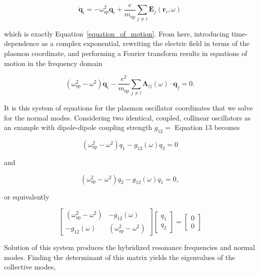 \documentclass[journal=apchd5,manuscript=article]{achemso}
\begin{document}
\begin{equation}
\ddot{\textbf{q}}_i = -\omega_{\textrm{sp}}^2\textbf{q}_i + \frac{e}{m_{\textrm{sp}}}\sum_{j\neq i}\textbf{E}_j(\textbf{r}_i,\omega)
\label{equation_of_motion_again}
\end{equation}

\noindent which is exactly Equation~\ref{equation_of_motion}. From here, introducing time-dependence as a complex exponential, rewriting the electric field in terms of the plasmon coordinate, and performing a Fourier transform results in equations of motion in the frequency domain

\begin{equation}
(\omega_{\textrm{sp}}^2-\omega^2)\textbf{q}_i -\frac{e^2}{m_\textrm{sp}}\sum_{j\neq i}\boldsymbol{\Lambda}_{ij}(\omega)\cdot\textbf{q}_j = 0.
\label{fourier_eom}
\end{equation}

It is this system of equations for the plasmon oscillator coordinates that we solve for the normal modes. Considering two identical, coupled, collinear oscillators as an example with dipole-dipole coupling strength $g_{12} = $ Equation 13 becomes

\begin{equation}
(\omega_{\textrm{sp}}^2-\omega^2)q_1 -g_{12}(\omega)q_2 = 0
\label{fourier_eom_1}
\end{equation}

and

\begin{equation}
(\omega_{\textrm{sp}}^2-\omega^2)q_2 -g_{12}(\omega)q_1 = 0,
\label{fourier_eom_2}
\end{equation}

or equivalently

\begin{equation}
\begin{bmatrix}
(\omega_{\textrm{sp}}^2-\omega^2) & -g_{12}(\omega)\\
-g_{12}(\omega) & (\omega_{\textrm{sp}}^2-\omega^2)
\end{bmatrix}
\begin{bmatrix}
q_1\\
q_2
\end{bmatrix}
=
\begin{bmatrix}
0\\
0
\end{bmatrix}
\label{eom_matrix}
\end{equation}

Solution of this system produces the hybridized resonance frequencies and normal modes.
Finding the determinant of this matrix yields the eigenvalues of the collective modes,
\end{document}
